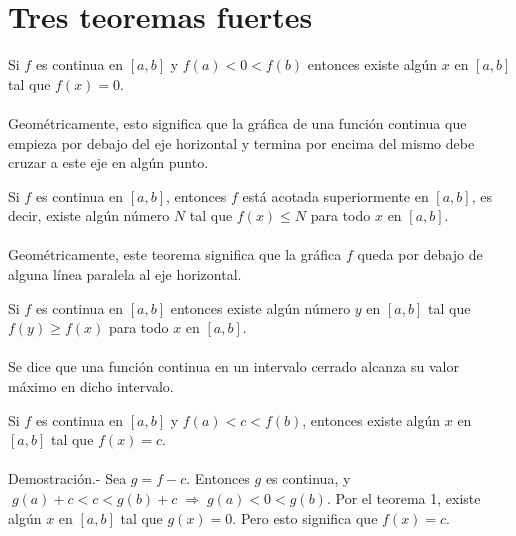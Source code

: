 
\chapter{Tres teoremas fuertes}


\begin{tcolorbox}[colback = white]
    \begin{teo}
	Si $f$ es continua en $[a,b]$ y $f(a)<0<f(b)$ entonces existe algún $x$ en $[a,b]$ tal que $f(x)=0$.\\\\
	Geométricamente, esto significa que la gráfica de una función continua que empieza por debajo del eje horizontal y termina por encima del mismo debe cruzar a este eje en algún punto.
    \end{teo}
\end{tcolorbox}

\begin{tcolorbox}[colback = white]
    \begin{teo}
	Si $f$ es continua en $[a,b]$, entonces $f$ está acotada superiormente en $[a,b]$, es decir, existe algún número $N$ tal que $f(x)\leq N$ para todo $x$ en $[a,b]$.\\\\
	Geométricamente, este teorema significa que la gráfica $f$ queda por debajo de alguna línea paralela al eje horizontal. 
    \end{teo}
\end{tcolorbox}

\begin{tcolorbox}[colback = white]
    \begin{teo}
	Si $f$ es continua en $[a,b]$ entonces existe algún número $y$ en $[a,b]$ tal que $f(y)\geq f(x)$ para todo $x$ en $[a,b]$.\\\\
	Se dice que una función continua en un intervalo cerrado alcanza su valor máximo en dicho intervalo.
    \end{teo}
\end{tcolorbox}

\begin{teo}
    Si $f$ es continua en $[a,b]$ y $f(a)<c<f(b)$, entonces existe algún $x$ en $[a,b]$ tal que $f(x)=c$.\\\\
    Demostración.-\; Sea $g=f-c$. Entonces $g$ es continua, y $\; g(a)+c < c < g(b) + c \; \Longrightarrow \; g(a)<0<g(b)$. Por el teorema 1, existe algún $x$ en $[a,b]$ tal que $g(x)=0$. Pero esto significa que $f(x)=c.$\\\\
\end{teo}

